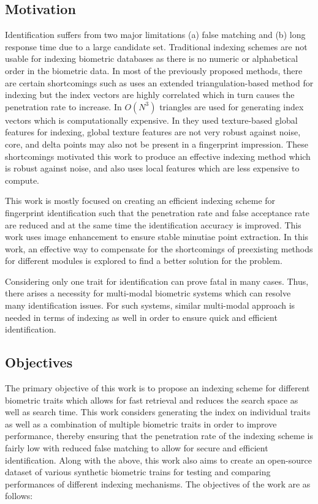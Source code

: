 \subsection{Motivation}
Identification suffers from two major limitations (a) false matching and (b) long response time due to a large candidate set. 
Traditional indexing schemes are not usable for indexing biometric databases as there is no numeric or alphabetical order in the biometric data.
In most of the previously proposed methods, there are certain shortcomings such as
\cite{Kavati2017} uses an extended triangulation-based method for indexing but the index vectors are
highly correlated which in turn causes the penetration rate to increase. In \cite{Bhanu2003} $O(N^3)$
triangles are used for generating index vectors which is computationally expensive.
In \cite{Germain1997}  they used texture-based global features for indexing, global texture features are not very robust against noise, core, and delta points may also not be present in
a fingerprint impression.
These shortcomings motivated this work to produce an effective indexing method
which is robust against noise, and also uses local features which are less expensive to
compute.

This work is mostly focused on creating an efficient indexing scheme for fingerprint
identification such that the penetration rate and false acceptance rate are reduced
and at the same time the identification accuracy is improved. This work uses image
enhancement to ensure stable minutiae point extraction.
 In this work, an effective way to compensate for the shortcomings of preexisting methods
for different modules is explored to find a better solution for the problem.

Considering only one trait for identification can prove fatal in many cases. Thus, there arises a necessity for multi-modal biometric systems which can resolve many identification issues. For such systems, similar multi-modal approach is needed in terms of indexing as well in order to ensure quick and efficient identification.

\subsection{Objectives}
The primary objective of this work is to propose an indexing scheme for different biometric traits which allows for fast retrieval and reduces the search space as well as search time. This work considers generating the index on individual traits as well as a combination of multiple biometric traits in order to improve performance, thereby ensuring that the penetration rate of the indexing scheme is fairly low with
reduced false matching to allow for secure and efficient identification. Along with the above, this work also aims to create an open-source dataset of various synthetic biometric trains for testing and comparing performances of different indexing mechanisms.
The objectives of the work are as follows:

